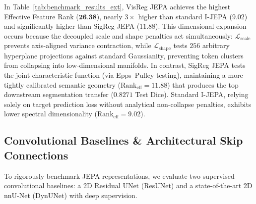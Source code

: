 \documentclass{article}
\begin{document}
In Table~\ref{tab:benchmark_results_ext}, VisReg JEPA achieves the highest Effective Feature Rank ($\textbf{26.38}$), nearly $3\times$ higher than standard I-JEPA ($9.02$) and significantly higher than SigReg JEPA ($11.88$). This dimensional expansion occurs because the decoupled scale and shape penalties act simultaneously: $\mathcal{L}_{\text{scale}}$ prevents axis-aligned variance contraction, while $\mathcal{L}_{\text{shape}}$ tests $256$ arbitrary hyperplane projections against standard Gaussianity, preventing token clusters from collapsing into low-dimensional manifolds. In contrast, SigReg JEPA tests the joint characteristic function (via Epps--Pulley testing), maintaining a more tightly calibrated semantic geometry ($\text{Rank}_{\text{eff}} = 11.88$) that produces the top downstream segmentation transfer ($0.8271$ Test Dice). Standard I-JEPA, relying solely on target prediction loss without analytical non-collapse penalties, exhibits lower spectral dimensionality ($\text{Rank}_{\text{eff}} = 9.02$).

\subsection{Convolutional Baselines \& Architectural Skip Connections}

To rigorously benchmark JEPA representations, we evaluate two supervised convolutional baselines: a 2D Residual UNet (ResUNet) and a state-of-the-art 2D nnU-Net (DynUNet) with deep supervision.
\end{document}
